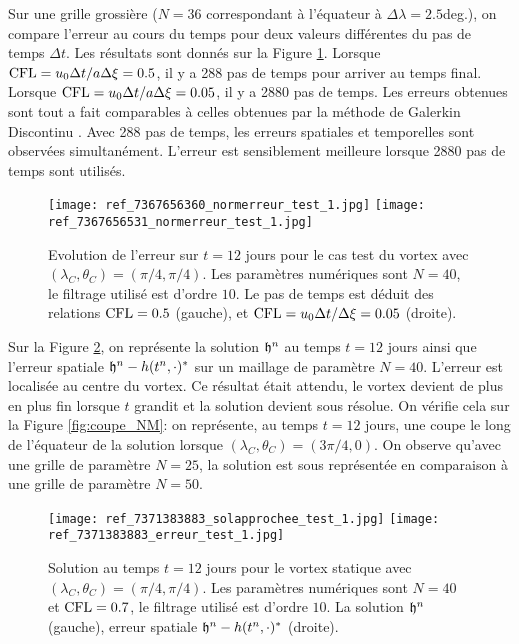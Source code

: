 Sur une grille grossière ($N=36$ correspondant à l'équateur à $\Delta \lambda = 2.5$deg.), on compare l'erreur au cours du temps pour deux valeurs différentes du pas de temps $\Delta t$. Les résultats sont donnés sur la Figure \ref{fig:cfl_NM}. Lorsque $\text{CFL} = u_0 \Delta t / a \Delta \xi = 0.5$, il y a 288 pas de temps pour arriver au temps final. Lorsque $\text{CFL} = u_0 \Delta t / a \Delta \xi = 0.05$, il y a 2880 pas de temps. Les erreurs obtenues sont tout a fait comparables à celles obtenues par la méthode de Galerkin Discontinu \cite{Nair2008}. Avec 288 pas de temps, les erreurs spatiales et temporelles sont observées simultanément. L'erreur est sensiblement meilleure lorsque 2880 pas de temps sont utilisés.

\begin{figure}[htbp]
\begin{center}
\texttt{[image: ref\_7367656360\_normerreur\_test\_1.jpg]}
\texttt{[image: ref\_7367656531\_normerreur\_test\_1.jpg]}
\end{center}
\caption{Evolution de l'erreur sur $t=12$ jours pour le cas test du vortex \cite{Nair2002} avec $(\lambda_C, \theta_C) = (\pi/4, \pi/4)$. Les paramètres numériques sont $N=40$, le filtrage utilisé est d'ordre $10$. Le pas de temps est déduit des relations $\text{CFL} = 0.5$ (gauche), et $\text{CFL} = u_0 \Delta t / \Delta \xi = 0.05$ (droite).}
\label{fig:cfl_NM}
\end{figure}

Sur la Figure \ref{fig:space_NM}, on représente la solution $\mathfrak{h}^n$ au temps $t=12$ jours ainsi que l'erreur spatiale $\mathfrak{h}^n-h(t^n,\cdot)^*$ sur un maillage de paramètre $N=40$. L'erreur est localisée au centre du vortex. Ce résultat était attendu, le vortex devient de plus en plus fin lorsque $t$ grandit et la solution devient sous résolue. 
On vérifie cela sur la Figure \ref{fig:coupe_NM}: on représente, au temps $t=12$ jours, une coupe le long de l'équateur de la solution lorsque $(\lambda_C, \theta_C)=(3 \pi/4,0)$. On observe qu'avec une grille de paramètre $N=25$, la solution est sous représentée en comparaison à une grille de paramètre $N=50$.

\begin{figure}[htbp]
\begin{center}
\texttt{[image: ref\_7371383883\_solapprochee\_test\_1.jpg]}
\texttt{[image: ref\_7371383883\_erreur\_test\_1.jpg]}
\end{center}
\caption{Solution au temps $t=12$ jours pour le vortex statique \cite{Nair2002} avec $(\lambda_C, \theta_C) = (\pi/4, \pi/4)$. Les paramètres numériques sont $N=40$ et $\text{CFL} = 0.7$, le filtrage utilisé est d'ordre $10$. La solution $\mathfrak{h}^n$ (gauche), erreur spatiale $\mathfrak{h}^n - h(t^n,\cdot)^*$ (droite).}
\label{fig:space_NM}
\end{figure}

